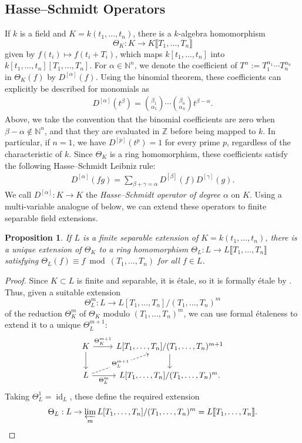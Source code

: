 \documentclass[11pt,leqno]{amsart}
\numberwithin{equation}{section}
\newtheorem{proposition}[theorem]{Proposition}
\theoremstyle{definition}
\theoremstyle{remark}
\newcommand{\N}{\mathbb{N}}
\newcommand{\Z}{\mathbb{Z}}
\newcommand{\Id}{\operatorname{id}}
\newcommand{\lre}{\longrightarrow}
\newcommand{\llb}{\llbracket}
\newcommand{\rrb}{\rrbracket}
\begin{document}
\subsection*{Hasse--Schmidt Operators} If $k$ is a field and $K = k(t_1, \dots, t_n)$, there is a $k$-algebra homomorphism $$\Theta_K: K \lre K \llb T_1, \dots, T_n \rrb$$ given by $f(t_i) \mapsto f(t_i + T_i)$, which maps $k[t_1, \dots, t_n]$ into $k[t_1, \dots, t_n][T_1, \dots, T_n]$. For $\alpha \in \N^n$, we denote the coefficient of $T^\alpha:= T^{\alpha_1}_1 \cdots T^{\alpha_n}_n$ in $\Theta_K(f)$ by $D^{[\alpha]}(f)$. Using the binomial theorem, these coefficients can explicitly be described for monomials as \begin{align} \label{eq:HSmonomial} D^{[\alpha]}(t^{\beta}) = \binom{\beta_1}{\alpha_1} \cdots \binom{\beta_n}{\alpha_n} t^{\beta - \alpha}. \end{align} Above, we take the convention that the binomial coefficients are zero when $\beta - \alpha \notin \N^n$, and that they are evaluated in $\Z$ before being mapped to $k$. In particular, if $n = 1$, we have $D^{[p]}(t^p) = 1$ for every prime $p$, regardless of the characteristic of $k$. Since $\Theta_K$ is a ring homomorphism, these coefficients satisfy the following Hasse--Schmidt Leibniz rule: \begin{align} \label{HSLeibniz} D^{[\alpha]}(fg) = \sum_{\beta + \gamma = \alpha} D^{[\beta]}(f) D^{[\gamma]}(g). \end{align} We call $D^{[\alpha]}: K \to K$ the \textit{Hasse--Schmidt operator of degree $\alpha$} on $K$. Using a multi-variable analogue of \cite[Theorem 1.5]{traves00} below, we can extend these operators to finite separable field extensions.

\begin{proposition} \label{prop:HSTaylorExpansion}
If $L$ is a finite separable extension of $K = k(t_1, \dots, t_n)$, there is a unique extension of $\Theta_K$ to a ring homomorphism $\Theta_L: L \to L \llb T_1, \dots, T_n \rrb$ satisfying $\Theta_L(f) \equiv f \bmod (T_1, \dots, T_n)$ for all $f \in L$.
\end{proposition}


\begin{proof}
Since $K \subset L$ is finite and separable, it is \'etale, so it is formally \'etale by \cite[Section~10.150, \href{https://stacks.math.columbia.edu/tag/00UP}{Tag~00UP}]{stacks-project}. Thus, given a suitable extension $$\Theta^m_L: L \lre L [T_1, \dots, T_n ]/(T_1, \dots, T_n)^m$$ of the reduction $\Theta^m_K$ of $\Theta_K$ modulo $(T_1, \dots, T_n)^m$, we can use formal \'etaleness to extend it to a unique $\Theta^{m + 1}_L$:
\[
\begin{tikzcd}
K \arrow[r, "\Theta^{m+1}_K"] \arrow[d] & L [T_1, \dots, T_n ]/(T_1, \dots, T_n)^{m+1} \arrow[d] \\
L \arrow[r, "\Theta^m_L"'] \arrow[ur, dashed, "\Theta^{m+1}_L" description] & L [T_1, \dots, T_n ]/(T_1, \dots, T_n)^m.
\end{tikzcd}
\]
Taking $\Theta_L^1= \Id_L$, these define the required extension $$\Theta_L: L \to \varprojlim_m L [T_1, \dots, T_n ]/(T_1, \dots, T_n)^m = L \llb T_1, \dots, T_n \rrb.$$
\end{proof}
\end{document}
